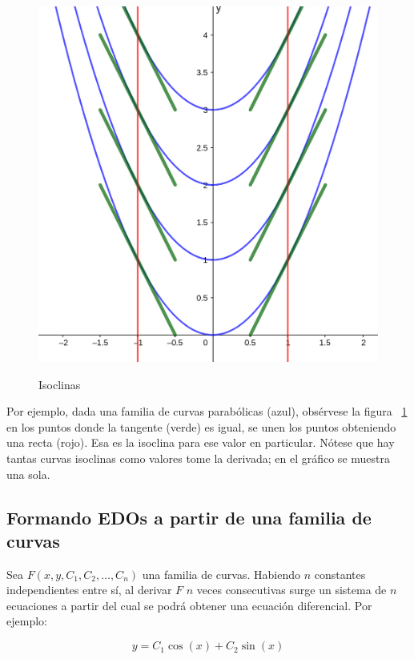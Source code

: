 \documentclass{article}
\begin{document}
\begin{figure}[ht]
\caption{Isoclinas}
\includegraphics[scale=1]{img/edo_fig001_isoclinas.png} 
\centering
\label{fig:isoclinas}
\end{figure}

Por ejemplo, dada una familia de curvas parabólicas (azul), obsérvese la figura ~\ref{fig:isoclinas} en los puntos donde la tangente (verde) es igual, se unen los puntos obteniendo una recta (rojo). Esa es la isoclina para ese valor en particular. Nótese que hay tantas curvas isoclinas como valores tome la derivada; en el gráfico se muestra una sola.

\subsection{Formando EDOs a partir de una familia de curvas}

Sea $F(x, y, C_1, C_2, \ldots, C_n)$ una familia de curvas. Habiendo $n$ constantes independientes entre sí, al derivar $F$ $n$ veces consecutivas surge un sistema de $n$ ecuaciones a partir del cual se podrá obtener una ecuación diferencial. Por ejemplo:

\begin{equation}
y = C_1 \cos(x) + C_2 \sin(x)
\end{equation}
\end{document}
